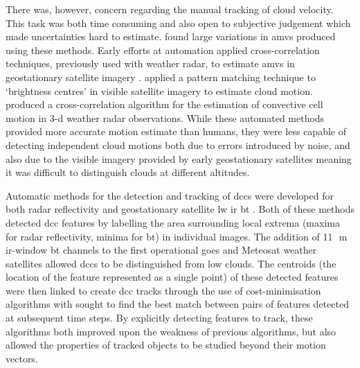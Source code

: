 There was, however, concern regarding the manual tracking of cloud velocity.
This task was both time consuming and also open to subjective judgement which made uncertainties hard to estimate.
\citet{fujita_satellite-tracked_1975} found large variations in \acrshort{amv}s produced using these methods.
Early efforts at automation applied cross-correlation techniques, previously used with weather radar, to estimate \acrshort{amv}s in geostationary satellite imagery \citep{leese_determination_1970}.
\citet{endlich_use_1971} applied a pattern matching technique to `brightness centres' in visible satellite imagery to estimate cloud motion.
\citet{rinehart_three-dimensional_1978} produced a cross-correlation algorithm for the estimation of convective cell motion in 3-d weather radar observations.
While these automated methods provided more accurate motion estimate than humans, they were less capable of detecting independent cloud motions both due to errors introduced by noise, and also due to the visible imagery provided by early geostationary satellites meaning it was difficult to distinguish clouds at different altitudes.

Automatic methods for the detection and tracking of \acrshort{dcc}s were developed for both radar reflectivity \citep{crane_automatic_1979} and geostationary satellite \acrshort{lw} \acrfull{ir} \acrfull{bt} \citep{endlich_automatic_1981}.
Both of these methods detected \acrshort{dcc} features by labelling the area surrounding local extrema (maxima for radar reflectivity, minima for \acrshort{bt}) in individual images.
The addition of 11\,\unit{\mu m} \acrshort{ir}-window \acrshort{bt} channels to the first operational \acrshort{goes} and Meteosat weather satellites allowed \acrshort{dcc}s to be distinguished from low clouds.
The centroids (the location of the feature represented as a single point) of these detected features were then linked to create \acrshort{dcc} tracks through the use of cost-minimisation algorithms with sought to find the best match between pairs of features detected at subsequent time steps.
By explicitly detecting features to track, these algorithms both improved upon the weakness of previous algorithms, but also allowed the properties of tracked objects to be studied beyond their motion vectors.

